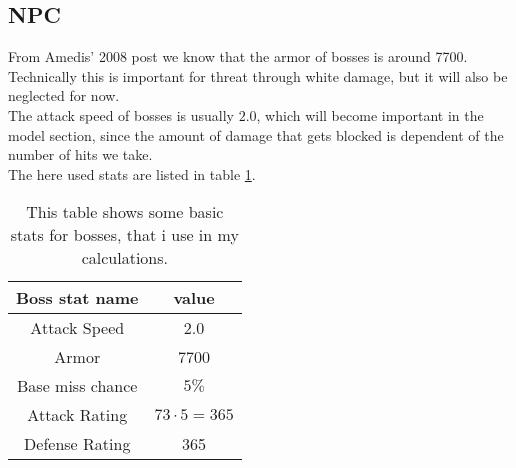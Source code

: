 \documentclass[a4paper,10pt]{article}
\begin{document}
\subsection{NPC}
From Amedis' 2008 post we know that the armor of bosses is around 7700. Technically this is important for threat through white damage, but it will also be neglected for now.\\
The attack speed of bosses is usually $2.0$, which will become important in the model section, since the amount of damage that gets blocked is dependent of the number of hits we take.\\
The here used stats are listed in table \ref{tab_boss_stats}.
\begin{table}
 \centering 
 \begin{tabular}{c|c}
  Boss stat name& value\\
  \hline
  Attack Speed & 2.0\\
  Armor&7700\\
  Base miss chance& $5\%$\\
  Attack Rating & $73\cdot 5=365$\\
  Defense Rating & 365
 \end{tabular}
\caption{This table shows some basic stats for bosses, that i use in my calculations.}
\label{tab_boss_stats}
\end{table}
\end{document}
